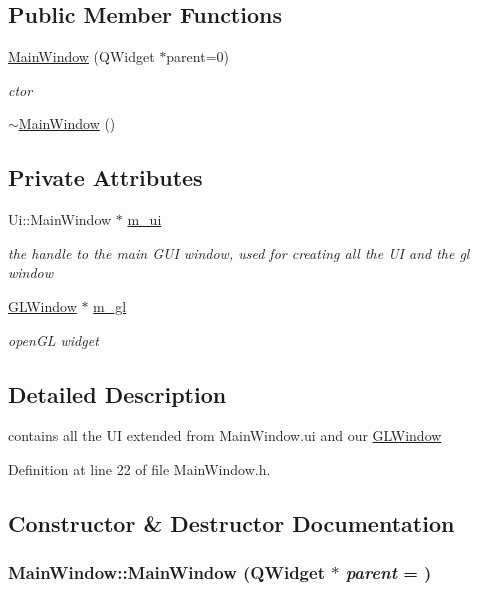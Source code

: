 \subsection*{Public Member Functions}
\begin{DoxyCompactItemize}
\item 
\hyperlink{class_main_window_a8b244be8b7b7db1b08de2a2acb9409db}{MainWindow} (QWidget $\ast$parent=0)
\begin{DoxyCompactList}\small\item\em ctor \item\end{DoxyCompactList}\item 
\hyperlink{class_main_window_ae98d00a93bc118200eeef9f9bba1dba7}{$\sim$MainWindow} ()
\end{DoxyCompactItemize}
\subsection*{Private Attributes}
\begin{DoxyCompactItemize}
\item 
Ui::MainWindow $\ast$ \hyperlink{class_main_window_a5a3eb262660797d9a4d52ed16edb6d11}{m\_\-ui}
\begin{DoxyCompactList}\small\item\em the handle to the main GUI window, used for creating all the UI and the gl window \item\end{DoxyCompactList}\item 
\hyperlink{class_g_l_window}{GLWindow} $\ast$ \hyperlink{class_main_window_a8f18111d1b422167f8b9a688f38f8969}{m\_\-gl}
\begin{DoxyCompactList}\small\item\em openGL widget \item\end{DoxyCompactList}\end{DoxyCompactItemize}


\subsection{Detailed Description}
contains all the UI extended from MainWindow.ui and our \hyperlink{class_g_l_window}{GLWindow} 

Definition at line 22 of file MainWindow.h.



\subsection{Constructor \& Destructor Documentation}
\hypertarget{class_main_window_a8b244be8b7b7db1b08de2a2acb9409db}{
\subsubsection[{MainWindow}]{\setlength{\rightskip}{0pt plus 5cm}MainWindow::MainWindow (QWidget $\ast$ {\em parent} = {})}}
\label{class_main_window_a8b244be8b7b7db1b08de2a2acb9409db}


